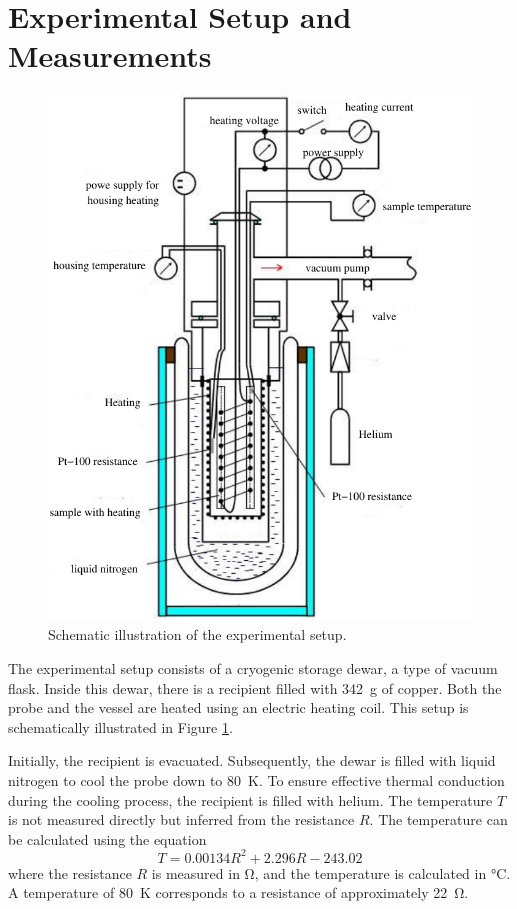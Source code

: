 \section{Experimental Setup and Measurements}
\label{sec:procedure}
\begin{figure}
    \centering
    \includegraphics[width=\textwidth]{pictures/setup.png}
    \caption{Schematic illustration of the experimental setup. \cite{V47}}
    \label{fig:setup}
\end{figure}

The experimental setup consists of a cryogenic storage dewar, a type of vacuum flask. 
Inside this dewar, there is a recipient filled with \SI{342}{\gram} of copper. 
Both the probe and the vessel are heated using an electric heating coil. 
This setup is schematically illustrated in Figure \ref{fig:setup}.

Initially, the recipient is evacuated. 
Subsequently, the dewar is filled with liquid nitrogen to cool the probe 
down to \SI{80}{\kelvin}. 
To ensure effective thermal conduction during the cooling process, 
the recipient is filled with helium. 
The temperature $T$ is not measured directly but inferred from the resistance $R$. 
The temperature can be calculated using the equation
\begin{equation}
    T=\num{0.00134}R^2+\num{2.296}R-243.02
    \label{eqn:rzut}
\end{equation}
where the resistance $R$ is measured in \si{\ohm}, and the temperature is 
calculated in \si{\celsius}.
A temperature of \SI{80}{\kelvin} corresponds to a resistance of approximately 
\SI{22}{\ohm}. 

